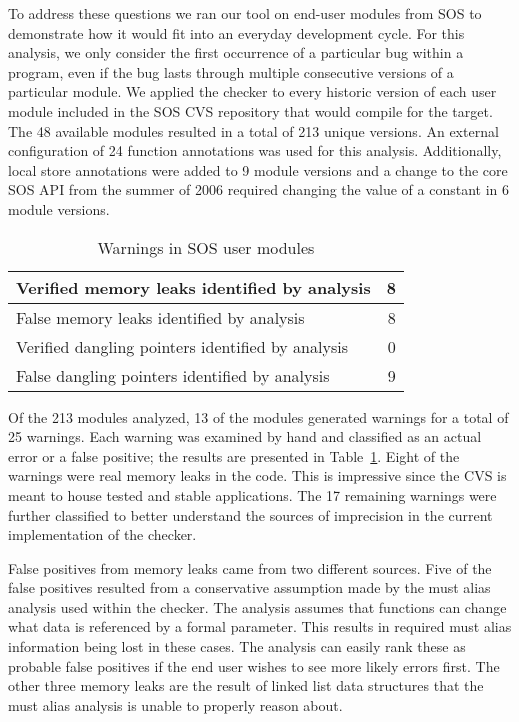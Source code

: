 To address these questions we ran our tool on 
end-user modules from SOS
to demonstrate
how it would fit into an everyday development cycle.  For this
analysis, we only consider the first occurrence of a particular bug
within a program, even if the bug lasts through multiple consecutive
versions of a particular module.  We applied the checker to every
historic version of each user module included in the SOS CVS
repository that would compile for the  target.  The 48
available modules resulted in a total of 213 unique versions.
%
An external configuration of 24 function annotations was used for this
analysis.  
%
Additionally, local store annotations were added to 9 module versions
and a change to the core SOS API from the summer of 2006 required
changing the value of a constant in 6 module versions.


\begin{table}
\caption{Warnings in SOS user modules}
%
\label{tab:module}
\centering 
\begin{tabular}{| l | r |}
    \hline 
    Verified memory leaks identified by analysis & 8 \\
    \hline
    False memory leaks identified by analysis & 8 \\
    \hline 
    Verified dangling pointers identified by analysis & 0 \\
    \hline 
    False dangling pointers identified by analysis & 9 \\
    \hline 
\end{tabular} 
%
\end{table}

Of the 213 modules analyzed, 13 of the modules generated warnings for a
total of 25 warnings.
%
Each warning was examined by hand and classified as an actual error or
a false positive; the results are presented in Table~\ref{tab:module}.  
%
Eight of the warnings were real memory leaks in the code.
This is impressive since the CVS is meant to house tested and stable
applications.
%
The 17 remaining warnings were further classified to better understand
the sources of imprecision in the current implementation of the
checker.  

\smallskip{}

False positives from memory leaks came from two different sources.
Five of the false positives resulted from a conservative assumption
made by the must alias analysis used within the checker.  The analysis
assumes that functions can change what data is referenced by a formal
parameter.  This results in required must alias information being lost
in these cases.  The analysis can easily rank these as probable false
positives if the end user wishes to see more likely errors first.  The
other three memory leaks are the result of linked list data structures
that the must alias analysis is unable to properly reason about.  

